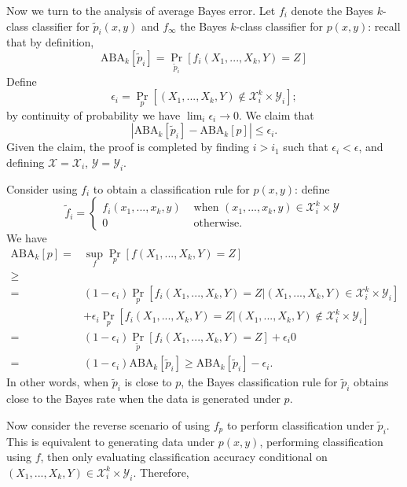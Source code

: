 \documentclass[12pt]{article}
\begin{document}
Now we turn to the analysis of average Bayes error.
Let $f_i$ denote the Bayes $k$-class classifier for $\tilde{p}_i(x, y)$
and
$f_\infty$ the Bayes $k$-class classifier for $p(x, y)$: recall that by definition,
\[
\text{ABA}_k[\tilde{p}_i] = \Pr_{\tilde{p}_i}[f_i(X_1,...,X_k, Y) = Z]
\]
Define
\[
\epsilon_i = \Pr_p[(X_1,...,X_k, Y)\notin \mathcal{X}_i^k \times \mathcal{Y}_i];
\]
by continuity of probability we have $\lim_i \epsilon_i \to 0$.
We claim that
\[
|\text{ABA}_k[\tilde{p}_i] - \text{ABA}_k[p]| \leq \epsilon_i.
\]
Given the claim, the proof is completed by finding $i > i_1$ such that $\epsilon_i < \epsilon$,
and defining $\mathcal{X} = \mathcal{X}_i$, $\mathcal{Y} = \mathcal{Y}_i$.

Consider using $f_i$ to obtain a classification rule for $p(x, y)$:
define
\[
\tilde{f}_i = \begin{cases}f_i(x_1,...,x_k, y) & \text{ when } (x_1,...,x_k, y) \in \mathcal{X}_i^k \times \mathcal{Y}\\
0 & \text{ otherwise.} 
\end{cases}
\]
We have
\begin{align*}
\text{ABA}_k[p] =& \sup_f \Pr_p[f(X_1,...,X_k, Y) = Z]
\\ \geq& 
\\=& (1-\epsilon_i)\Pr_p[f_i(X_1,...,X_k, Y) = Z|(X_1,...,X_k, Y)\in \mathcal{X}_i^k \times \mathcal{Y}_i]
\\&+ \epsilon_i \Pr_p[f_i(X_1,...,X_k, Y) = Z|(X_1,...,X_k, Y)\notin \mathcal{X}_i^k \times \mathcal{Y}_i]
\\=& (1-\epsilon_i)\Pr_{\tilde{p}}[f_i(X_1,...,X_k, Y) = Z]
+ \epsilon_i 0
\\=& (1-\epsilon_i) \text{ABA}_k[\tilde{p}_i] \geq \text{ABA}_k[\tilde{p}_i] - \epsilon_i.
\end{align*}
In other words, when $\tilde{p}_i$ is close to $p$, the Bayes
classification rule for $\tilde{p}_i$ obtains close to the Bayes rate
when the data is generated under $p$.

Now consider the reverse scenario of using $f_p$ to perform
classification under $\tilde{p}_i$.  This is equivalent to generating
data under $p(x, y)$, performing classification using $f$, then only
evaluating classification accuracy conditional on $(X_1,...,X_k,
Y)\in \mathcal{X}_i^k \times \mathcal{Y}_i$.  Therefore,
\end{document}
